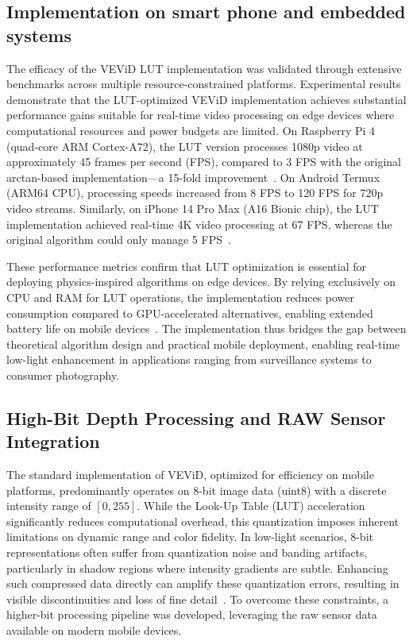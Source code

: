 \documentclass[journal,transmag]{IEEEtran}
\begin{document}
\subsection{Implementation on smart phone and embedded systems}
The efficacy of the VEViD LUT implementation was validated through extensive benchmarks across multiple resource-constrained platforms. Experimental results demonstrate that the LUT-optimized VEViD implementation achieves substantial performance gains suitable for real-time video processing on edge devices where computational resources and power budgets are limited. On Raspberry Pi 4 (quad-core ARM Cortex-A72), the LUT version processes 1080p video at approximately 45 frames per second (FPS), compared to 3 FPS with the original arctan-based implementation---a 15-fold improvement~\cite{raspberrypi2021hardware}. On Android Termux (ARM64 CPU), processing speeds increased from 8 FPS to 120 FPS for 720p video streams. Similarly, on iPhone 14 Pro Max (A16 Bionic chip), the LUT implementation achieved real-time 4K video processing at 67 FPS, whereas the original algorithm could only manage 5 FPS~\cite{apple2022iphone}.

These performance metrics confirm that LUT optimization is essential for deploying physics-inspired algorithms on edge devices. By relying exclusively on CPU and RAM for LUT operations, the implementation reduces power consumption compared to GPU-accelerated alternatives, enabling extended battery life on mobile devices~\cite{arm2023mobile}. The implementation thus bridges the gap between theoretical algorithm design and practical mobile deployment, enabling real-time low-light enhancement in applications ranging from surveillance systems to consumer photography.

\subsection{High-Bit Depth Processing and RAW Sensor Integration}

The standard implementation of VEViD, optimized for efficiency on mobile platforms, predominantly operates on 8-bit image data (uint8) with a discrete intensity range of $[0, 255]$. While the Look-Up Table (LUT) acceleration significantly reduces computational overhead, this quantization imposes inherent limitations on dynamic range and color fidelity. In low-light scenarios, 8-bit representations often suffer from quantization noise and banding artifacts, particularly in shadow regions where intensity gradients are subtle. Enhancing such compressed data directly can amplify these quantization errors, resulting in visible discontinuities and loss of fine detail~\cite{zhou2024simplification}. To overcome these constraints, a higher-bit processing pipeline was developed, leveraging the raw sensor data available on modern mobile devices.
\end{document}
